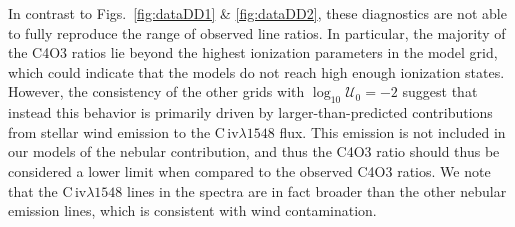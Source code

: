 \documentclass[preprint2]{aastex61}
\newcommand{\civ}{C\,{\sc iv}\xspace}
\newcommand{\logten}{\ensuremath{\log_{10}}}
\newcommand{\logUeq}[1]{\ensuremath{\logten \mathcal{U}_0 = #1}}
\begin{document}
In contrast to Figs.~\ref{fig:dataDD1} \& \ref{fig:dataDD2}, these diagnostics are not able to fully reproduce the range of observed line ratios. In particular, the majority of the C4O3 ratios lie beyond the highest ionization parameters in the model grid, which could indicate that the models do not reach high enough ionization states. However, the consistency of the other grids with \logUeq{-2} suggest that instead this behavior is primarily driven by larger-than-predicted contributions from stellar wind emission to the \civ$\lambda1548$ flux. This emission is not included in our models of the nebular contribution, and thus the C4O3 ratio should thus be considered a lower limit when compared to the observed C4O3 ratios. We note that the \civ$\lambda1548$ lines in the \citet{Berg+2016} spectra are in fact broader than the other nebular emission lines, which is consistent with wind contamination.
\end{document}
